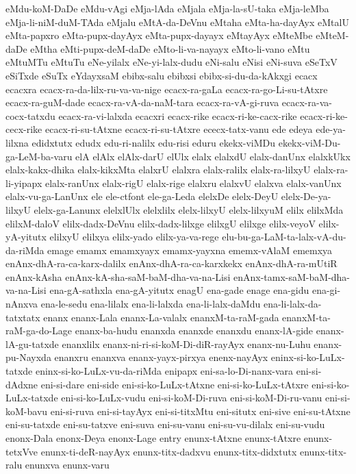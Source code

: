 {eMdu-koM-DaDe
eMdu-vAgi
eMja-lAda
eMjala
eMja-la-sU-taka
eMja-leMba
eMja-li-niM-duM-TAda
eMjalu
eMtA-da-DeVnu
eMtaha
eMta-ha-dayAyx
eMtalU
eMta-papxro
eMta-pupx-dayAyx
eMta-pupx-dayayx
eMtayAyx
eMteMbe
eMteM-daDe
eMtha
eMti-pupx-deM-daDe
eMto-li-va-nayayx
eMto-li-vano
eMtu
eMtuMTu
eMtuTu
eNe-yilalx
eNe-yi-lalx-dudu
eNi-salu
eNisi
eNi-suva
eSeTxV
eSiTxde
eSuTx
eYdayxsaM
ebibx-salu
ebibxsi
ebibx-si-du-da-kAkxgi
ecacx
ecacxra
ecacx-ra-da-lilx-ru-va-va-nige
ecacx-ra-gaLa
ecacx-ra-go-Li-su-tAtxre
ecacx-ra-guM-dade
ecacx-ra-vA-da-naM-tara
ecacx-ra-vA-gi-ruva
ecacx-ra-va-cocx-tatxdu
ecacx-ra-vi-lalxda
ecacxri
ecacx-rike
ecacx-ri-ke-cacx-rike
ecacx-ri-ke-cecx-rike
ecacx-ri-su-tAtxne
ecacx-ri-su-tAtxre
ececx-tatx-vanu
ede
edeya
ede-ya-lilxna
edidxtutx
edudx
edu-ri-nalilx
edu-risi
eduru
ekekx-viMDu
ekekx-viM-Du-ga-LeM-ba-varu
elA
elAlx
elAlx-darU
elUlx
elalx
elalxdU
elalx-danUnx
elalxkUkx
elalx-kakx-dhika
elalx-kikxMta
elalxrU
elalxra
elalx-ralilx
elalx-ra-lilxyU
elalx-ra-li-yipapx
elalx-ranUnx
elalx-rigU
elalx-rige
elalxru
elalxvU
elalxva
elalx-vanUnx
elalx-vu-ga-LanUnx
ele
ele-ctfont
ele-ga-Leda
elelxDe
elelx-DeyU
elelx-De-ya-lilxyU
elelx-ga-Lanunx
elelxlUlx
elelxlilx
elelx-lilxyU
elelx-lilxyuM
elilx
elilxMda
elilxM-daloV
elilx-dadx-DeVnu
elilx-dadx-lilxge
elilxgU
elilxge
elilx-veyoV
elilx-yA-yitutx
elilxyU
elilxya
elilx-yado
elilx-ya-va-rege
elu-bu-ga-LaM-ta-lalx-vA-du-da-riMda
emage
emamx
emamxyayx
emamx-yayxna
ememx-vAlaM
ememxya
enAnx-dhA-ra-ca-karx-dalilx
enAnx-dhA-ra-ca-karxkekx
enAnx-dhA-ra-mUtiR
enAnx-kAsha
enAnx-kA-sha-saM-baM-dha-va-na-Lisi
enAnx-tamx-saM-baM-dha-va-na-Lisi
ena-gA-sathxla
ena-gA-yitutx
enagU
ena-gade
enage
ena-gidu
ena-gi-nAnxva
ena-le-sedu
ena-lilalx
ena-li-lalxda
ena-li-lalx-daMdu
ena-li-lalx-da-tatxtatx
enanx
enanx-Lala
enanx-La-valalx
enanxM-ta-raM-gada
enanxM-ta-raM-ga-do-Lage
enanx-ba-hudu
enanxda
enanxde
enanxdu
enanx-lA-gide
enanx-lA-gu-tatxde
enanxlilx
enanx-ni-ri-si-koM-Di-diR-rayAyx
enanx-nu-Luhu
enanx-pu-Nayxda
enanxru
enanxva
enanx-yayx-pirxya
enenx-nayAyx
eninx-si-ko-LuLx-tatxde
eninx-si-ko-LuLx-vu-da-riMda
enipapx
eni-sa-lo-Di-nanx-vara
eni-si-dAdxne
eni-si-dare
eni-side
eni-si-ko-LuLx-tAtxne
eni-si-ko-LuLx-tAtxre
eni-si-ko-LuLx-tatxde
eni-si-ko-LuLx-vudu
eni-si-koM-Di-ruva
eni-si-koM-Di-ru-vanu
eni-si-koM-bavu
eni-si-ruva
eni-si-tayAyx
eni-si-titxMtu
eni-situtx
eni-sive
eni-su-tAtxne
eni-su-tatxde
eni-su-tatxve
eni-suva
eni-su-vanu
eni-su-vu-dilalx
eni-su-vudu
enonx-Dala
enonx-Deya
enonx-Lage
entry
enunx-tAtxne
enunx-tAtxre
enunx-tetxVve
enunx-ti-deR-nayAyx
enunx-titx-dadxvu
enunx-titx-didxtutx
enunx-titx-ralu
enunxva
enunx-varu
}
